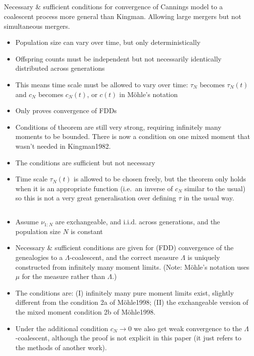 \documentclass{article}
\begin{document}
\subsection*{\cite{mohle1998}}
Necessary \& sufficient conditions for convergence of Cannings model to a coalescent process more general than Kingman. Allowing large mergers but not simultaneous mergers.
\begin{itemize}
\item Population size can vary over time, but only deterministically
\item Offspring counts must be independent but not necessarily identically distributed across generations
\item This means time scale must be allowed to vary over time: $\tau_N$ becomes $\tau_N(t)$ and $c_N$ becomes $c_N(t)$, or $c(t)$ in M\"ohle's notation
\item Only proves convergence of FDDs
\item Conditions of theorem are still very strong, requiring infinitely many moments to be bounded. There is now a condition on one mixed moment that wasn't needed in Kingman1982.
\item The conditions are sufficient but not necessary
\item Time scale $\tau_N(t)$ is allowed to be chosen freely, but the theorem only holds when it is an appropriate function (i.e.\ an inverse of $c_N$ similar to the usual) so this is not a very great generalisation over defining $\tau$ in the usual way.
\end{itemize}


\subsection*{\cite{mohlesagitov1998}}
\begin{itemize}
\item Assume $\nu_{1:N}$ are exchangeable, and i.i.d. across generations, and the population size $N$ is constant
\item Necessary \& sufficient conditions are given for (FDD) convergence of the genealogies to a $\Lambda$-coalescent, and the correct measure $\Lambda$ is uniquely constructed from infinitely many moment limits. (Note: M\"ohle's notation uses $\mu$ for the measure rather than $\Lambda$.)
\item The conditions are: (I) infinitely many pure moment limits exist, slightly different from the condition 2a of M\"ohle1998; (II) the exchangeable version of the mixed moment condition 2b of M\"ohle1998.
\item Under the additional condition $c_N\to0$ we also get weak convergence to the $\Lambda$-coalescent, although the proof is not explicit in this paper (it just refers to the methods of another work).
\end{itemize}
\end{document}

